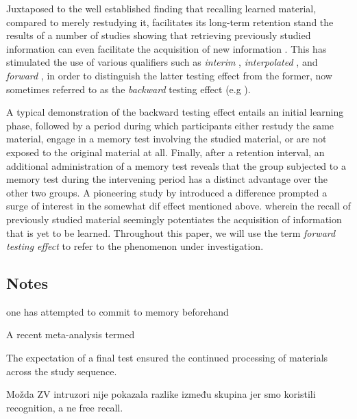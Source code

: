 \documentclass[../main.tex]{subfiles}
\begin{document}
Juxtaposed to the well established finding that recalling learned material, compared to merely restudying it, facilitates its long-term retention \citep{roedigeriiiPowerTestingMemory2006, roedigeriiiTestEnhancedLearningTaking2006, rowlandEffectTestingRestudy2014, adesopeRethinkingUseTests2017, roedigeriiiCriticalRoleRetrieval2011, gloverTestingPhenomenonNot1989} stand the results of a number of studies showing that retrieving previously studied information can even facilitate the acquisition of new information \citep{chanRetrievalPotentiatesNew2018}. This has stimulated the use of various qualifiers such as \textit{interim} \citep{wissmanInterimTestEffect2011}, \textit{interpolated} \citep{szpunarInterpolatedMemoryTests2013}, and \textit{forward} \citep{pastotterRetrievalPracticeEnhances2014,yangEnhancingLearningRetrieval2018}, in order to distinguish the latter testing effect from the former, now sometimes referred to as the \textit{backward} testing effect (e.g \citealp{yangEnhancingLearningRetrieval2018}). 

A typical demonstration of the backward testing effect entails an initial learning phase, followed by a period during which participants either restudy the same material, engage in a memory test involving the studied material, or are not exposed to the original material at all. Finally, after a retention interval, an additional administration of a memory test reveals that the group subjected to a memory test during the intervening period has a distinct advantage over the other two groups. A pioneering study by \cite{darleyEffectsPriorFree1971} introduced a difference prompted a surge of interest in the somewhat dif effect mentioned above.  wherein the recall of previously studied material seemingly potentiates the acquisition of information that is yet to be learned. Throughout this paper, we will use the term \textit{forward testing effect} to refer to the phenomenon under investigation. 



{
    \biblio
}

\subsection{Notes}
one has attempted to commit to memory beforehand

A recent meta-analysis termed 

The expectation of a final test ensured the
continued processing of materials across the study sequence.


Možda ZV intruzori nije pokazala razlike između skupina jer smo koristili recognition, a ne free recall.
\end{document}
